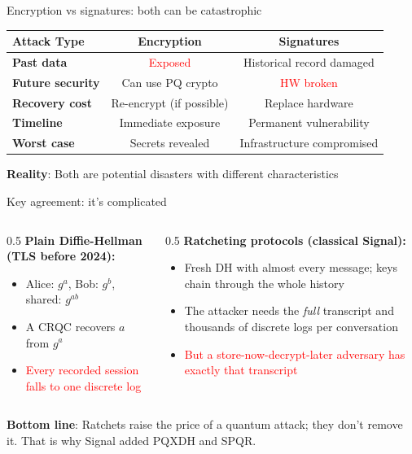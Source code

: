 \ifdefined\PRESENTATION\else\PassOptionsToClass{handout}{beamer}\fi\documentclass[aspectratio=169, lualatex]{beamer}
\begin{document}
\begin{frame}{Encryption vs signatures: both can be catastrophic}
	\begin{center}
		\begin{tabular}{|l|c|c|}
			\hline
			\textbf{Attack Type}     & \textbf{Encryption}      & \textbf{Signatures}        \\
			\hline
			\hline
			\textbf{Past data}       & \textcolor{red}{Exposed} & Historical record damaged  \\
			\hline
			\textbf{Future security} & Can use PQ crypto        & \textcolor{red}{HW broken} \\
			\hline
			\textbf{Recovery cost}   & Re-encrypt (if possible) & Replace hardware           \\
			\hline
			\textbf{Timeline}        & Immediate exposure       & Permanent vulnerability    \\
			\hline
			\textbf{Worst case}      & Secrets revealed         & Infrastructure compromised \\
			\hline
		\end{tabular}
	\end{center}
	\begin{center}
		\textbf{Reality}: Both are potential disasters with different characteristics
	\end{center}
\end{frame}

\begin{frame}{Key agreement: it's complicated}
	\begin{columns}[c]
		\begin{column}{0.5\textwidth}
			\textbf{Plain Diffie-Hellman (TLS before 2024):}
			\begin{itemize}
				\item Alice: $g^a$, Bob: $g^b$, shared: $g^{ab}$
				\item A CRQC recovers $a$ from $g^a$
				\item \textcolor{red}{Every recorded session falls to one discrete log}
			\end{itemize}
		\end{column}
		\begin{column}{0.5\textwidth}
			\textbf{Ratcheting protocols (classical Signal):}
			\begin{itemize}
				\item Fresh DH with almost every message; keys chain through the whole history
				\item The attacker needs the \textit{full} transcript and thousands of discrete logs per conversation
				\item \textcolor{red}{But a store-now-decrypt-later adversary has exactly that transcript}
			\end{itemize}
		\end{column}
	\end{columns}
	\vspace{5mm}
	\begin{center}
		\textbf{Bottom line}: Ratchets raise the price of a quantum attack; they don't remove it. That is why Signal added PQXDH and SPQR.
	\end{center}
\end{frame}
\end{document}
